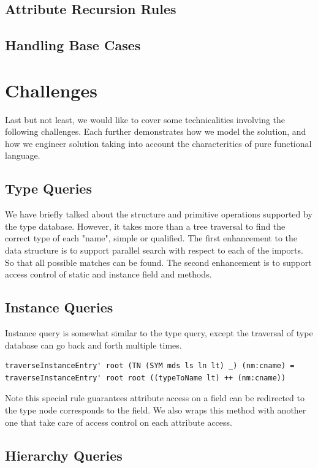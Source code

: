 \documentclass[12pt,letterpaper]{article}
\begin{document}
\subsection{Attribute Recursion Rules}
\subsection{Handling Base Cases}


\section{Challenges}
Last but not least, we would like to cover some technicalities involving the following challenges. Each further demonstrates how we model the solution, and how we engineer solution taking into account the characteritics of pure functional language.

\subsection{Type  Queries}
We have briefly talked about the structure and primitive operations supported by the type database. However, it takes more than a tree traversal to find the correct type of each "name", simple or qualified. The first enhancement to the data structure is to support parallel search with respect to each of the imports. So that all possible matches can be found. The second enhancement is to support access control of static and instance field and methods.

\subsection{Instance Queries}
Instance query is somewhat similar to the type query, except the traversal of type database can go back and forth multiple times.
\begin{lstlisting}
traverseInstanceEntry' root (TN (SYM mds ls ln lt) _) (nm:cname) = traverseInstanceEntry' root root ((typeToName lt) ++ (nm:cname))
\end{lstlisting}

Note this special rule guarantees attribute access on a field can be redirected to the type node corresponds to the field. We also wraps this method with another one that take care of access control on each attribute access.

\subsection{Hierarchy Queries}
\end{document}
